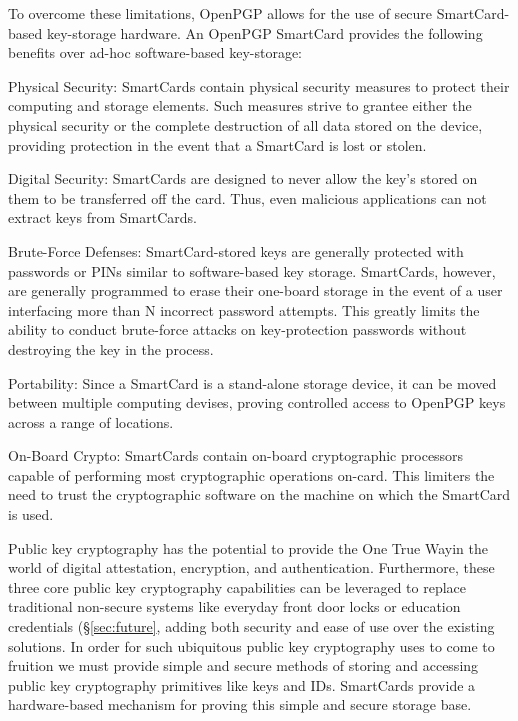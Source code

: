 \documentclass[11pt, twocolumn]{article}
\newenvironment{packed_desc}{
\begin{description}
  \setlength{\itemsep}{1pt}
  \setlength{\parskip}{0pt}
  \setlength{\parsep}{0pt}
}{\end{description}}
\begin{document}
To overcome these limitations, OpenPGP allows for the use of secure
SmartCard-based key-storage hardware. An OpenPGP SmartCard provides
the following benefits over ad-hoc software-based key-storage:

\begin{packed_desc}
\item{Physical Security:} SmartCards contain physical security
  measures to protect their computing and storage elements. Such
  measures strive to grantee either the physical security or the
  complete destruction of all data stored on the device, providing
  protection in the event that a SmartCard is lost or stolen.
\item{Digital Security:} SmartCards are designed to never allow the
  key's stored on them to be transferred off the card. Thus, even
  malicious applications can not extract keys from SmartCards.
\item{Brute-Force Defenses:} SmartCard-stored keys are generally
  protected with passwords or PINs similar to software-based key
  storage. SmartCards, however, are generally programmed to erase
  their one-board storage in the event of a user interfacing more than
  N incorrect password attempts. This greatly limits the ability to
  conduct brute-force attacks on key-protection passwords without
  destroying the key in the process.
\item{Portability:} Since a SmartCard is a stand-alone storage device,
  it can be moved between multiple computing devises, proving
  controlled access to OpenPGP keys across a range of locations.
\item{On-Board Crypto:} SmartCards contain on-board cryptographic
  processors capable of performing most cryptographic operations
  on-card. This limiters the need to trust the cryptographic software
  on the machine on which the SmartCard is used.
\end{packed_desc}

Public key cryptography has the potential to provide the One True
Way\texttrademark in the world of digital attestation, encryption, and
authentication. Furthermore, these three core public key cryptography
capabilities can be leveraged to replace traditional non-secure
systems like everyday front door locks or education credentials
(\S\ref{sec:future}, adding both security and ease of use over the
existing solutions. In order for such ubiquitous public key
cryptography uses to come to fruition we must provide simple and
secure methods of storing and accessing public key cryptography
primitives like keys and IDs. SmartCards provide a hardware-based
mechanism for proving this simple and secure storage base.
\end{document}
